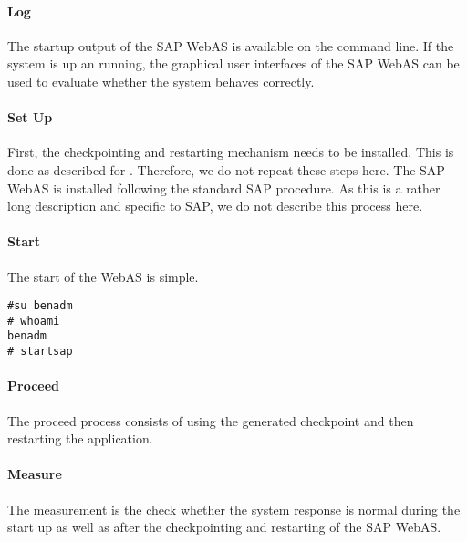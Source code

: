 \paragraph{Log}
The startup output of the SAP WebAS is available on the command line. If the system is up an running, the graphical user interfaces of the SAP WebAS can be used to evaluate whether the system behaves correctly.

\paragraph{Set Up}
First, the checkpointing and restarting mechanism needs to be installed. This is done as described for . Therefore, we do not repeat these steps here. The SAP WebAS is installed following the standard SAP procedure. As this is a rather long description and specific to SAP, we do not describe this process here.

\paragraph{Start}
The start of the WebAS is simple.
\begin{lstlisting}
#su benadm
# whoami
benadm
# startsap
\end{lstlisting}

\paragraph{Proceed}
The proceed process consists of using the generated checkpoint and then restarting the application.

\paragraph{Measure}
The measurement is the check whether the system response is normal during the start up as well as after the checkpointing and restarting of the SAP WebAS.


